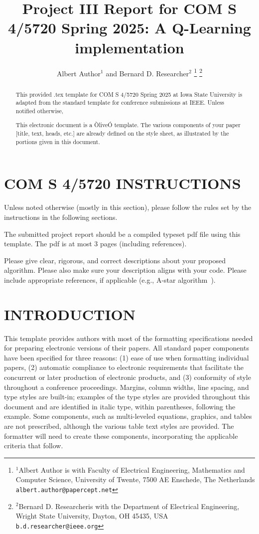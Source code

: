 \documentclass[letterpaper, 10 pt, conference]{ieeeconf}   %
\title{\LARGE \bf
Project III Report for COM S 4/5720 Spring 2025: A Q-Learning implementation
}
\author{Albert Author$^{1}$ and Bernard D. Researcher$^{2}$%
\thanks{$^{1}$Albert Author is with Faculty of Electrical Engineering, Mathematics and Computer Science,
        University of Twente, 7500 AE Enschede, The Netherlands
        {\tt\small albert.author@papercept.net}}%
\thanks{$^{2}$Bernard D. Researcheris with the Department of Electrical Engineering, Wright State University,
        Dayton, OH 45435, USA
        {\tt\small b.d.researcher@ieee.org}}%
}
\begin{document}
\maketitle
\thispagestyle{empty}
\pagestyle{empty}


\begin{abstract}
	This provided .tex template for COM S 4/5720 Spring 2025 at Iowa State University is adapted from the standard template for conference submissions at IEEE. Unless notified otherwise,

	This electronic document is a ÒliveÓ template. The various components of your paper [title, text, heads, etc.] are already defined on the style sheet, as illustrated by the portions given in this document.

\end{abstract}


\section{COM S 4/5720 INSTRUCTIONS}
Unless noted otherwise (mostly in this section), please follow the rules set by the instructions in the following sections.

The submitted project report should be a compiled typeset pdf file using this template. The pdf is at most 3 pages (including references).

Please give clear, rigorous, and correct descriptions about your proposed algorithm. Please also make sure your description aligns with your code. Please include appropriate references, if applicable (e.g., A-star algorithm~\cite{hart1968formal}).

\section{INTRODUCTION}

This template provides authors with most of the formatting specifications needed for preparing electronic versions of their papers. All standard paper components have been specified for three reasons: (1) ease of use when formatting individual papers, (2) automatic compliance to electronic requirements that facilitate the concurrent or later production of electronic products, and (3) conformity of style throughout a conference proceedings. Margins, column widths, line spacing, and type styles are built-in; examples of the type styles are provided throughout this document and are identified in italic type, within parentheses, following the example. Some components, such as multi-leveled equations, graphics, and tables are not prescribed, although the various table text styles are provided. The formatter will need to create these components, incorporating the applicable criteria that follow.
\end{document}
